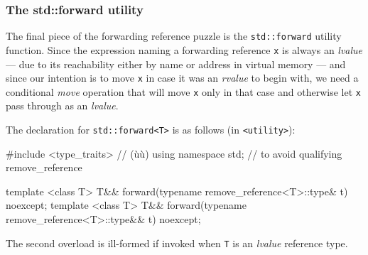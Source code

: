 \subsubsection[The {\tt std::forward} utility]{The {\SubsubsecCode std::forward} utility}\label{the-std::forward-utility}

The final piece of the forwarding reference puzzle is the
\texttt{std::forward} utility function. Since the expression naming a
forwarding reference \texttt{x} is always an \emph{lvalue} --- due to its
reachability either by name or address in virtual memory --- and since our
intention is to move \texttt{x} in case it was an \emph{rvalue} to begin
with, we need a conditional \emph{move} operation that will move
\texttt{x} only in that case and otherwise let \texttt{x} pass through as
an \emph{lvalue}.

The declaration for \texttt{std::forward<T>} is as follows (in
\texttt{<utility>}):

\begin{emcppshiddenlisting}[emcppsbatch=e7]
#include <type_traits>  // (ù{}ù)
using namespace std; // to avoid qualifying remove_reference
\end{emcppshiddenlisting}
\begin{emcppslisting}[emcppsbatch=e7]
template <class T> T&& forward(typename remove_reference<T>::type& t) noexcept;
template <class T> T&& forward(typename remove_reference<T>::type&& t) noexcept;
\end{emcppslisting}

\noindent The second overload is ill-formed if invoked when \texttt{T} is an
\emph{lvalue} reference type.

